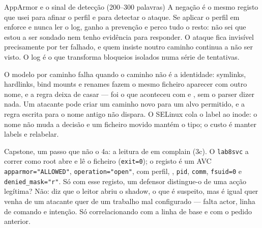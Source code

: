 \documentclass[a4paper,11pt]{article}
\newcommand{\cmd}[1]{\textcolor{sscnblue}{\texttt{#1}}}
\newcommand{\file}[1]{\texttt{\detokenize{#1}}}
\begin{document}
\begin{callout}{AppArmor e o sinal de detec\c{c}\~ao (200--300 palavras)}
\setlength{\parskip}{5pt}%
A nega\c{c}\~ao \'e o mesmo registo que usei para afinar o perfil e para detectar o
ataque. Se aplicar o perfil em enforce e nunca ler o log, ganho a preven\c{c}\~ao e perco
tudo o resto: n\~ao sei que estou a ser sondado nem tenho evid\^encia para responder. O
ataque fica invis\'ivel precisamente por ter falhado, e quem insiste noutro caminho
continua a n\~ao ser visto. O log \'e o que transforma bloqueios isolados numa s\'erie de
tentativas.

O modelo por caminho falha quando o caminho n\~ao \'e a identidade: symlinks, hardlinks,
bind mounts e renames fazem o mesmo ficheiro aparecer com outro nome, e a regra deixa de
casar --- foi o que aconteceu com \file{/bin/cat} e \file{/usr/bin/cat}, sem o parser
dizer nada. Um atacante pode criar um caminho novo para um alvo permitido, e a regra
escrita para o nome antigo n\~ao dispara. O SELinux cola o label ao inode: o nome n\~ao
muda a decis\~ao e um ficheiro movido mant\'em o tipo; o custo \'e manter labels e
relabelar.

Capstone, um passo que n\~ao o 4a: a leitura de \file{/etc/shadow} em complain (3c). O
\cmd{lab8svc} a correr como root abre e l\^e o ficheiro (\cmd{exit=0}); o registo \'e um
AVC \cmd{apparmor="ALLOWED"}, \cmd{operation="open"}, com perfil, \file{name}, \cmd{pid},
\cmd{comm}, \cmd{fsuid=0} e \cmd{denied\_mask="r"}. S\'o com esse registo, um defensor
distingue-o de uma ac\c{c}\~ao leg\'itima? N\~ao: diz que o leitor abriu o shadow, o que
\'e suspeito, mas \'e igual quer venha de um atacante quer de um trabalho mal
configurado --- falta actor, linha de comando e inten\c{c}\~ao. S\'o correlacionando com
a linha de base e com o pedido anterior.
\end{callout}
\end{document}
